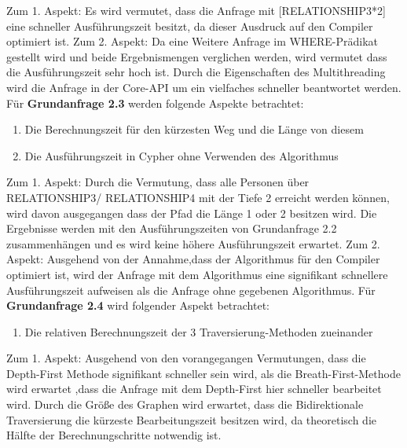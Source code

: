 Zum 1. Aspekt: Es wird vermutet, dass die Anfrage mit [RELATIONSHIP3*2] eine schneller Ausführungszeit besitzt, da dieser Ausdruck auf den Compiler optimiert ist. \newline
Zum 2. Aspekt: Da eine Weitere Anfrage im WHERE-Prädikat gestellt wird und beide Ergebnismengen verglichen werden, wird vermutet dass die Ausführungszeit sehr hoch ist. Durch die Eigenschaften des Multithreading wird die Anfrage in der Core-API um ein vielfaches schneller beantwortet werden. \newline  \newline
Für \textbf{Grundanfrage 2.3} werden folgende Aspekte betrachtet: 
\begin{enumerate}
	\item Die Berechnungszeit für den kürzesten Weg und die Länge von diesem
	\item Die Ausführungszeit in Cypher ohne Verwenden des Algorithmus
\end{enumerate}
Zum 1. Aspekt: Durch die Vermutung, dass alle Personen über RELATIONSHIP3/ RELATIONSHIP4 mit der Tiefe 2 erreicht werden können, wird davon ausgegangen dass der Pfad die Länge 1 oder 2 besitzen  wird. Die Ergebnisse werden mit den Ausführungszeiten von Grundanfrage 2.2 zusammenhängen und es wird keine höhere Ausführungszeit erwartet. \newline
Zum 2. Aspekt: Ausgehend von der Annahme,dass der Algorithmus für den Compiler optimiert ist, wird der Anfrage mit dem Algorithmus eine signifikant schnellere Ausführungszeit aufweisen als die Anfrage ohne gegebenen Algorithmus. \newline \newline
Für \textbf{Grundanfrage 2.4} wird folgender Aspekt betrachtet:
\begin{enumerate}
	\item Die relativen Berechnungszeit der 3 Traversierung-Methoden zueinander
\end{enumerate}
Zum 1. Aspekt: Ausgehend von den vorangegangen Vermutungen, dass die Depth-First Methode signifikant schneller sein wird, als die Breath-First-Methode wird erwartet ,dass die Anfrage mit dem Depth-First hier schneller bearbeitet wird. Durch die Größe des Graphen wird erwartet, dass die Bidirektionale Traversierung die kürzeste Bearbeitungszeit besitzen wird, da theoretisch die Hälfte der Berechnungschritte notwendig ist. \newline



